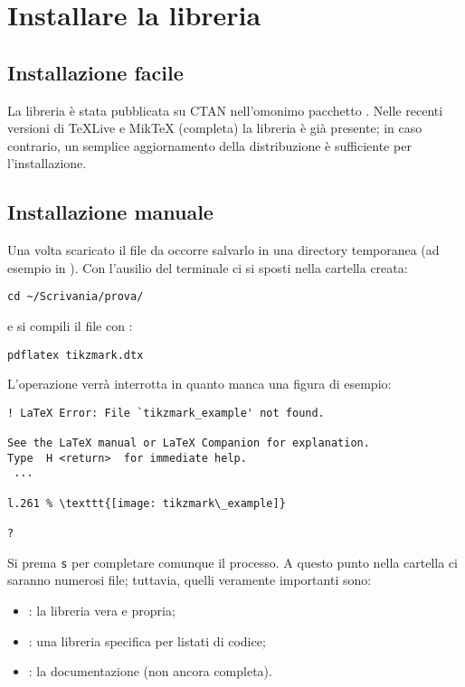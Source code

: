 \chapter{Installare la libreria}
\label{chap:install}
\section{Installazione facile}
La libreria è stata pubblicata su CTAN nell'omonimo pacchetto . Nelle recenti versioni di \TeX Live e Mik\TeX{} (completa) la libreria è già presente; in caso contrario, un semplice aggiornamento della distribuzione è sufficiente per l'installazione.

\section{Installazione manuale}
Una volta scaricato il file  da  occorre salvarlo in una directory temporanea (ad esempio in ). Con l'ausilio del terminale ci si sposti nella cartella creata:
\begin{verbatim}
cd ~/Scrivania/prova/
\end{verbatim}
e si compili il file  con :
\begin{verbatim}
pdflatex tikzmark.dtx
\end{verbatim}
L'operazione verrà interrotta in quanto manca una figura di esempio:
\begin{verbatim}
! LaTeX Error: File `tikzmark_example' not found.

See the LaTeX manual or LaTeX Companion for explanation.
Type  H <return>  for immediate help.
 ...                                              
                                                  
l.261 % \texttt{[image: tikzmark\_example]}
                                          
?
\end{verbatim}
Si prema \verb!s! per completare comunque il processo. A questo punto nella cartella  ci saranno numerosi file; tuttavia, quelli veramente importanti sono:
\begin{itemize}
\item {}: la libreria vera e propria;
\item {}: una libreria specifica per listati di codice;
\item {}: la documentazione (non ancora completa).
\end{itemize}
